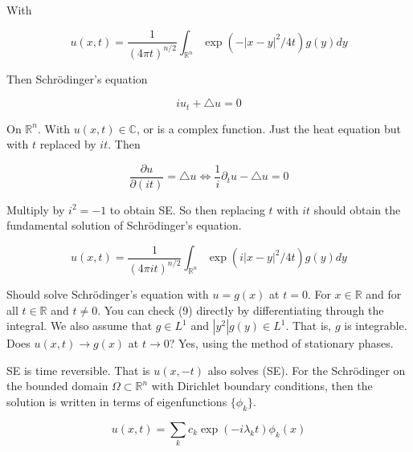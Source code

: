 \documentclass{article}
\newtheorem{one minute paper}[theorem]{One Minute Paper}
\begin{document}
With 

\begin{equation}
    u(x,t) = \frac{1}{(4\pi t)^{n/2}}\int_{\mathbb{R}^n}\exp(-|x-y|^2/4t)g(y)dy
\end{equation}

Then Schr\"odinger's equation 

\begin{equation}
    iu_t + \triangle u = 0
\end{equation}

On $\mathbb{R}^n$. With $u(x,t) \in \mathbb{C}$, or is a complex function. Just the heat equation but with $t$ replaced by $it$. Then 

\begin{equation}
    \frac{\partial u}{\partial (it)} = \triangle u \iff \frac{1}{i}\partial_t u - \triangle u =0
\end{equation}

Multiply by $i^2 = -1$ to obtain SE. So then replacing $t$ with $it$ should obtain the fundamental solution of Schr\"odinger's equation. 

\begin{equation}
    u(x,t) = \frac{1}{\left( 4\pi it \right)^{n/2}}\int_{\mathbb{R}^n}\exp(i|x-y|^2/4t)g(y)dy
\end{equation}

Should solve Schr\"odinger's equation with $u = g(x)$ at $t=0$. For $x \in \mathbb{R}$ and for all $t \in \mathbb{R}$ and $t \neq 0$. You can check (9) directly by differentiating through the integral. We also assume that 
$g \in L^1$ and $|y^2|g(y) \in L^1$. That is, $g$ is integrable. Does $u(x,t) \rightarrow g(x)$ at $t \rightarrow 0$? Yes, using the method of stationary phases. 

SE is time reversible. That is $u(x,-t)$ also solves (SE). For the Schr\"odinger on the bounded domain $\Omega \subset \mathbb{R}^n$ with Dirichlet boundary conditions, then the solution 
is written in terms of eigenfunctions $\{\phi_k\}$. 

\begin{equation}
    u(x,t) = \sum_{k}c_k \exp(-i \lambda_k t)\phi_k(x)
\end{equation}
\end{document}
